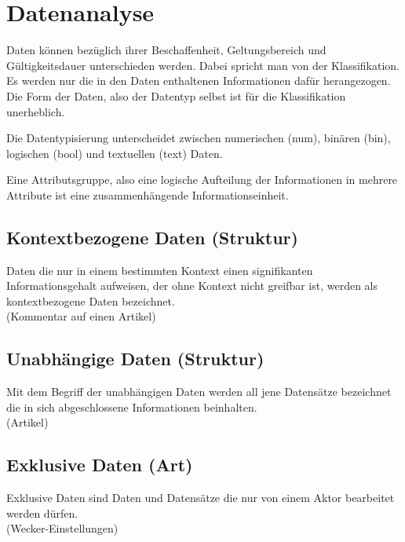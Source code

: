 \documentclass[oneside,11pt,parskip=half,ngerman]{scrreprt}
\begin{document}

\section{Datenanalyse}\label{datenanalyse}

Daten können bezüglich ihrer Beschaffenheit, Geltungsbereich und
Gültigkeitsdauer unterschieden werden. Dabei spricht man von der
Klassifikation. Es werden nur die in den Daten enthaltenen Informationen
dafür herangezogen. Die Form der Daten, also der Datentyp selbst ist für
die Klassifikation unerheblich.

Die Datentypisierung unterscheidet zwischen numerischen (num), binären
(bin), logischen (bool) und textuellen (text) Daten.

Eine Attributsgruppe, also eine logische Aufteilung der Informationen in
mehrere Attribute ist eine zusammenhängende Informationseinheit.

\subsection{Kontextbezogene Daten
(Struktur)}\label{kontextbezogene-daten-struktur}

Daten die nur in einem bestimmten Kontext einen signifikanten
Informationsgehalt aufweisen, der ohne Kontext nicht greifbar ist,
werden als kontextbezogene Daten bezeichnet.\\(Kommentar auf einen
Artikel)\\

\subsection{Unabhängige Daten
(Struktur)}\label{unabhuxe4ngige-daten-struktur}

Mit dem Begriff der unabhängigen Daten werden all jene Datensätze
bezeichnet die in sich abgeschlossene Informationen
beinhalten.\\(Artikel)

\subsection{Exklusive Daten (Art)}\label{exklusive-daten-art}

Exklusive Daten sind Daten und Datensätze die nur von einem Aktor
bearbeitet werden dürfen.\\(Wecker-Einstellungen)
\end{document}
